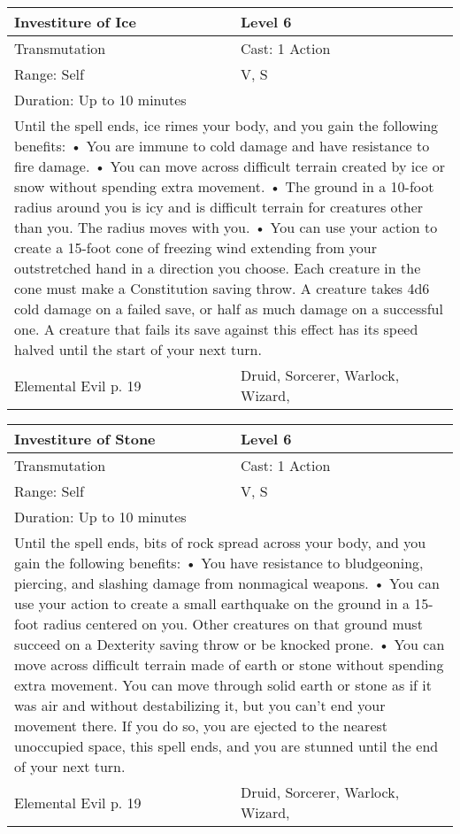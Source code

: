 \documentclass[11pt]{report}
\begin{document}
\begin{table}[H]
	\begin{tabular}{||p{6cm}|p{6cm}||}
		\hline\hline
		\bf{Investiture of Ice} & Level 6\\ \hline
		Transmutation & Cast: 1 Action\\ \hline
		Range: Self & V, S\\ \hline
		Duration: Up to 10 minutes & \\ \hline
		\multicolumn{2}{||p{12cm}||}{Until the spell ends, ice rimes your body, and you gain the following benefits:
• You are immune to cold damage and have resistance to fire damage.
• You can move across difficult terrain created by ice or snow without spending extra movement.
• The ground in a 10-foot radius around you is icy and is difficult terrain for creatures other than you. The radius moves with you.
• You can use your action to create a 15-foot cone of freezing wind extending from your outstretched hand in a direction you choose. Each creature in the cone must make a Constitution saving throw. A creature takes 4d6 cold damage on a failed save, or half as much damage on a successful one. A creature that fails its save against this effect has its speed halved until the start of your next turn.}\\ \hline
Elemental Evil p. 19 & Druid, Sorcerer, Warlock, Wizard, \\ \hline\hline
	\end{tabular}
\end{table}

\begin{table}[H]
	\begin{tabular}{||p{6cm}|p{6cm}||}
		\hline\hline
		\bf{Investiture of Stone} & Level 6\\ \hline
		Transmutation & Cast: 1 Action\\ \hline
		Range: Self & V, S\\ \hline
		Duration: Up to 10 minutes & \\ \hline
		\multicolumn{2}{||p{12cm}||}{Until the spell ends, bits of rock spread across your body, and you gain the following benefits:
• You have resistance to bludgeoning, piercing, and slashing damage from nonmagical weapons.
• You can use your action to create a small earthquake on the ground in a 15-foot radius centered on you. Other creatures on that ground must succeed on a Dexterity saving throw or be knocked prone.
• You can move across difficult terrain made of earth or stone without spending extra movement. You can move through solid earth or stone as if it was air and without destabilizing it, but you can’t end your movement there. If you do so, you are ejected to the nearest unoccupied space, this spell ends, and you are stunned until the end of your next turn.}\\ \hline
Elemental Evil p. 19 & Druid, Sorcerer, Warlock, Wizard, \\ \hline\hline
	\end{tabular}
\end{table}
\end{document}
